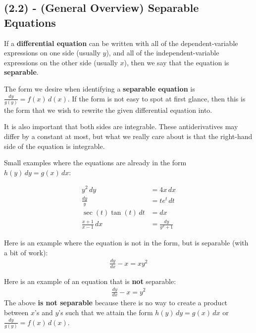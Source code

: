 \documentclass[11pt]{article}
\begin{document}
\subsection{(2.2) - (General Overview) Separable Equations}
If a \textbf{differential equation} can be written with all of the dependent-variable
expressions on one side (usually $y$), and all of the independent-variable expressions
on the other side (usually $x$), then we say that the equation is \textbf{separable}.

The form we desire when identifying a \textbf{separable equation} is $\frac{dy}{g(y)} = f(x)\,d(x)$. If
the form is not easy to spot at first glance, then this is the form that we wish to rewrite the given differential equation into.

It is also important that both sides are integrable. These antiderivatives may
differ by a constant at most, but what we really care about is that the right-hand side of the equation is integrable.

Small examples where the equations are already in the form \textbf{$h(y)\,dy = g(x)\,dx$}:

\begin{align}
y^{2}\,dy &= 4x\,dx \\
\frac{dy}{y} &= t e^{t}\,dt \\
\sec(t)\tan(t)\,dt &= dx \\
\frac{x+1}{x-1}\,dx &= \frac{dy}{y^{2}+1}
\end{align}

Here is an example where the equation is not in the form, but is separable (with a bit of work):
\begin{align}
\frac{dy}{dx} - x = xy^{2}
\end{align}

Here is an example of an equation that is \textbf{not} separable:
\begin{align}
\frac{dy}{dx} - x = y^{2}
\end{align}
The above \textbf{is not separable} because there is no way to create a product between $x$'s and $y$'s such that
we attain the form \textbf{$h(y)\,dy = g(x)\,dx$} or \textbf{$\frac{dy}{g(y)} = f(x)\,d(x)$}.
\end{document}
